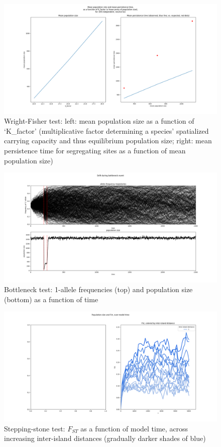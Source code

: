 ﻿\documentclass{article}
\begin{document}
\begin{figure}[h!]
\includegraphics[width=175mm]{./img/validation/wf/pop_size_vs_K_factor_and_mean_persist_t_vs_pop_size.png}
        \caption{Wright-Fisher test: left: mean population size as a function of `K\_factor' (multiplicative factor determining a species' spatialized carrying capacity and thus equilibrium population size; right: mean persistence time for segregating sites as a function of mean population size)}
\end{figure}


\begin{figure}[h!]
\includegraphics[width=175mm]{./img/validation/bottleneck/alleles_seem_to_take_too_long_to_fix.png}
        \caption{Bottleneck test: 1-allele frequencies (top) and population size (bottom) as a function of time}
\end{figure}


\begin{figure}[h!]
\includegraphics[width=175mm]{./img/validation/stepping_stone/Fst_over_time_vs_interisland_dist.png}
        \caption{Stepping-stone test: $F_{ST}$ as a function of model time, across increasing inter-island distances (gradually darker shades of blue)}
\end{figure}
\end{document}
